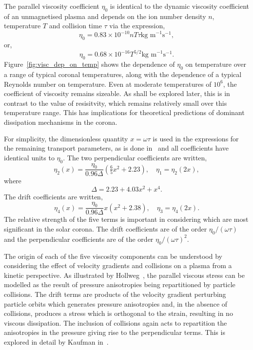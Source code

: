 The parallel viscosity coefficient $\eta_0$ is identical to the dynamic viscosity coefficient of an unmagnetised plasma and depends on the ion number density $n$, temperature $T$ and collision time $\tau$ via the expression,
\begin{equation}
  \label{eq:parallel_visc_coeff}
  \eta_0 = 0.83 \times 10^{-10} n T \tau \text{kg m}^{-1}\text{s}^{-1},
\end{equation}
or,
\begin{equation}
  \label{eq:parallel_visc_coeff2}
  \eta_0 = 0.68 \times 10^{-16} T^{5/2} \text{kg m}^{-1}\text{s}^{-1}.
\end{equation}
Figure~\ref{fig:visc_dep_on_temp} shows the dependence of $\eta_0$ on temperature over a range of typical coronal temperatures, along with the dependence of a typical Reynolds number on temperature. Even at moderate temperatures of $10^6$, the coefficient of viscosity remains sizeable. As shall be explored later, this is in contrast to the value of resisitvity, which remains relatively small over this temperature range. This has implications for theoretical predictions of dominant dissipation mechanisms in the corona.

For simplicity, the dimensionless quantity $x = \omega \tau$ is used in the expressions for the remaining transport parameters, as is done in~\cite{braginskiiTransportProcessesPlasma1965} and all coefficients have identical units to $\eta_0$. The two perpendicular coefficients are written,
\begin{equation}
  \label{eq:perp_visc_coeff}
  \eta_2(x) = \frac{\eta_0}{0.96 \Delta} \left( \tfrac{6}{5} x^2 + 2.23 \right), \quad \eta_1 = \eta_2(2x),
\end{equation}
where
\begin{equation}
  \label{eq:delta}
\Delta = 2.23 + 4.03x^2 + x^4.
\end{equation}
The drift coefficients are written,
\begin{equation}
  \label{eq:drift_visc_coeff}
  \eta_4(x) = \frac{\eta_0}{0.96 \Delta} x \left( x^2 + 2.38 \right), \quad \eta_3 = \eta_4(2x).
\end{equation}
The relative strength of the five terms is important in considering which are most significant in the solar corona. The drift coefficients are of the order $\eta_0/(\omega \tau)$ and the perpendicular coefficients are of the order $\eta_0/(\omega \tau)^2$.

The origin of each of the five viscosity components can be understood by considering the effect of velocity gradients and collisions on a plasma from a kinetic perspective. As illustrated by Hollweg~\cite{hollwegViscosityMagnetizedPlasma1985}, the parallel viscous stress can be modelled as the result of pressure anisotropies being repartitioned by particle collisions. The drift terms are products of the velocity gradient perturbing particle orbits which generates pressure anisotropies and, in the absence of collisions, produces a stress which is orthogonal to the strain, resulting in no viscous dissipation. The inclusion of collisions again acts to repartition the anisotropies in the pressure giving rise to the perpendicular terms. This is explored in detail by Kaufman in~\cite{kaufmanPlasmaViscosityMagnetic1960}.

